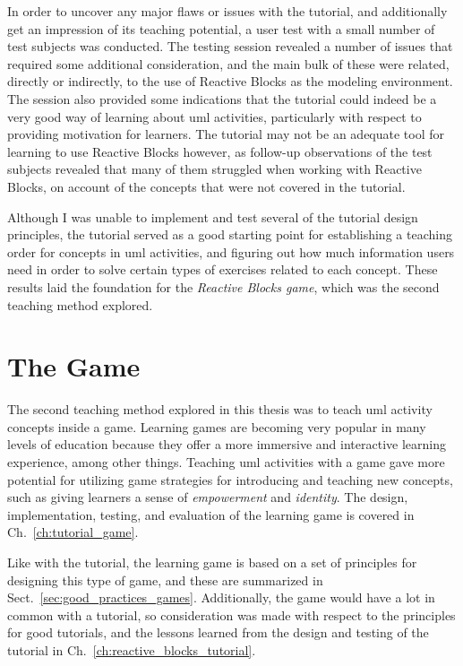 \noindent
In order to uncover any major flaws or issues with the tutorial, and additionally get an impression of its teaching potential, a user test with a small number of test subjects was conducted. The testing session revealed a number of issues that required some additional consideration, and the main bulk of these were related, directly or indirectly, to the use of Reactive Blocks as the modeling environment. The session also provided some indications that the tutorial could indeed be a very good way of learning about \gls{uml} activities, particularly with respect to providing motivation for learners. The tutorial may not be an adequate tool for learning to use Reactive Blocks however, as follow-up observations of the test subjects revealed that many of them struggled when working with Reactive Blocks, on account of the concepts that were not covered in the tutorial.

\noindent
Although I was unable to implement and test several of the tutorial design principles, the tutorial served as a good starting point for establishing a teaching order for concepts in \gls{uml} activities, and figuring out how much information users need in order to solve certain types of exercises related to each concept. These results laid the foundation for the \emph{Reactive Blocks game}, which was the second teaching method explored.

\section{The Game}
\label{sec:discussion_game}
The second teaching method explored in this thesis was to teach \gls{uml} activity concepts inside a game. Learning games are becoming very popular in many levels of education because they offer a more immersive and interactive learning experience, among other things. Teaching \gls{uml} activities with a game gave more potential for utilizing game strategies for introducing and teaching new concepts, such as giving learners a sense of \emph{empowerment} and \emph{identity}. The design, implementation, testing, and evaluation of the learning game is covered in Ch.~\ref{ch:tutorial_game}.

\noindent
Like with the tutorial, the learning game is based on a set of principles for designing this type of game, and these are summarized in Sect.~\ref{sec:good_practices_games}. Additionally, the game would have a lot in common with a tutorial, so consideration was made with respect to the principles for good tutorials, and the lessons learned from the design and testing of the tutorial in Ch.~\ref{ch:reactive_blocks_tutorial}.

